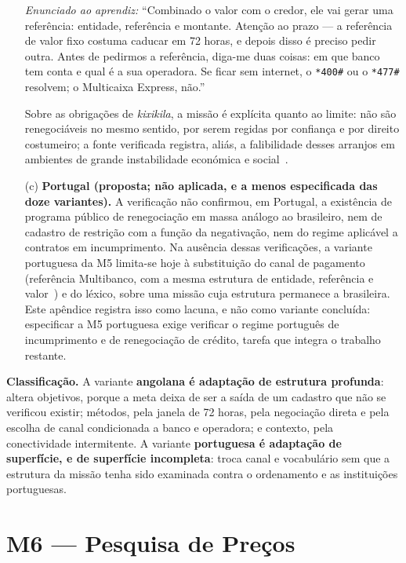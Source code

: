 \begin{enumerate}
\noindent\textit{Enunciado ao aprendiz:} ``Combinado o valor com o credor, ele vai gerar uma referência: entidade, referência e montante. Atenção ao prazo --- a referência de valor fixo costuma caducar em 72 horas, e depois disso é preciso pedir outra. Antes de pedirmos a referência, diga-me duas coisas: em que banco tem conta e qual é a sua operadora. Se ficar sem internet, o \texttt{*400\#} ou o \texttt{*477\#} resolvem; o Multicaixa Express, não.''

Sobre as obrigações de \textit{kixikila}, a missão é explícita quanto ao limite: não são renegociáveis no mesmo sentido, por serem regidas por confiança e por direito costumeiro; a fonte verificada registra, aliás, a falibilidade desses arranjos em ambientes de grande instabilidade económica e social~\cite{carlos2014kixikila}.

\item[(c)] \textbf{Portugal (proposta; não aplicada, e a menos especificada das doze variantes).} A verificação não confirmou, em Portugal, a existência de programa público de renegociação em massa análogo ao brasileiro, nem de cadastro de restrição com a função da negativação, nem do regime aplicável a contratos em incumprimento. Na ausência dessas verificações, a variante portuguesa da M5 limita-se hoje à substituição do canal de pagamento (referência Multibanco, com a mesma estrutura de entidade, referência e valor~\cite{sibs_multibanco}) e do léxico, sobre uma missão cuja estrutura permanece a brasileira. Este apêndice registra isso como lacuna, e não como variante concluída: especificar a M5 portuguesa exige verificar o regime português de incumprimento e de renegociação de crédito, tarefa que integra o trabalho restante.
\end{enumerate}

\noindent\textbf{Classificação.} A variante \textbf{angolana é adaptação de estrutura profunda}: altera objetivos, porque a meta deixa de ser a saída de um cadastro que não se verificou existir; métodos, pela janela de 72 horas, pela negociação direta e pela escolha de canal condicionada a banco e operadora; e contexto, pela conectividade intermitente. A variante \textbf{portuguesa é adaptação de superfície, e de superfície incompleta}: troca canal e vocabulário sem que a estrutura da missão tenha sido examinada contra o ordenamento e as instituições portuguesas.

\section*{M6 --- Pesquisa de Preços}

